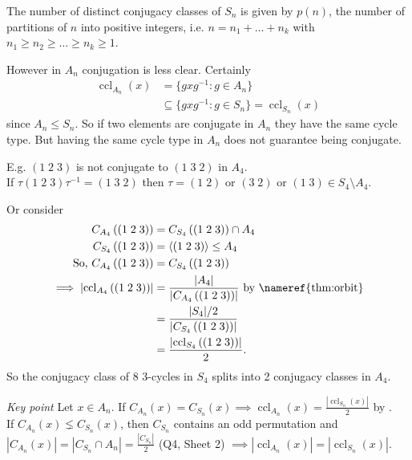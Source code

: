 \begin{corollary} \label{cor:6}
    The number of distinct conjugacy classes of $S_n$ is given by $p(n)$, the number of partitions of $n$ into positive integers, i.e. $n = n_1 + \ldots + n_k$ with $n_1 \geq n_2 \geq \ldots \geq n_k \geq 1$.
\end{corollary} 

However in $A_n$ conjugation is less clear. 
Certainly \begin{align*}
    \operatorname{ccl}_{A_n}(x) &= \{g x g^{-1} : g \in A_n\} \\
    &\subseteq \{g x g^{-1} : g \in S_n\} = \operatorname{ccl}_{S_n}(x)
\end{align*} since $A_n \leq S_n$.
So if two elements are conjugate in $A_n$ they have the same cycle type. 
But having the same cycle type in $A_n$ does not guarantee being conjugate.

E.g. $(1\; 2\; 3)$ is not conjugate to $(1\; 3\; 2)$ in $A_4$.\\
If $\tau (1\; 2\; 3) \tau^{-1} = (1\; 3\; 2)$ then $\tau = (1\; 2)$ or $(3\; 2)$ or $(1\; 3) \in S_4 \setminus A_4$.

Or consider 
\begin{align*}
    C_{A_4} \left( (1\; 2\; 3) \right) &= C_{S_4} \left( (1\; 2\; 3) \right) \cap A_4 \\
    C_{S_4} \left( (1\; 2\; 3) \right) &= \langle (1\; 2\; 3) \rangle \leq A_4 \\
    \text{So, } C_{A_4} \left( (1\; 2\; 3) \right) &= C_{S_4} \left( (1\; 2\; 3) \right) \\
    \implies \left| \operatorname{ccl}_{A_4} \left( (1\; 2\; 3) \right) \right| &= \frac{|A_4|}{\left| C_{A_4} \left( (1\; 2\; 3) \right) \right|} \text{ by \nameref{thm:orbit}} \\
    &= \frac{|S_4| / 2}{\left| C_{S_4} \left( (1\; 2\; 3) \right) \right|} \\
    &= \frac{\left| \operatorname{ccl}_{S_4} \left( (1\; 2\; 3) \right) \right|}{2}.
\end{align*} 
So the conjugacy class of 8 $3$-cycles in $S_4$ splits into 2 conjugacy classes in $A_4$.

\emph{Key point} Let $x \in A_n$.
If $C_{A_n}(x) = C_{S_n}(x) \implies \operatorname{ccl}_{A_n}(x) = \frac{| \operatorname{ccl}_{S_n}(x) |}{2}$ by . \\
If $C_{A_n}(x) \lneq C_{S_n}(x)$, then $C_{S_n}$ contains an odd permutation and $|C_{A_n}(x)| = |C_{S_n} \cap A_n| = \frac{|C_{S_n}|}{2}$ (Q4, Sheet 2) $\implies |\operatorname{ccl}_{A_n}(x)| = |\operatorname{ccl}_{S_n}(x)|$.

